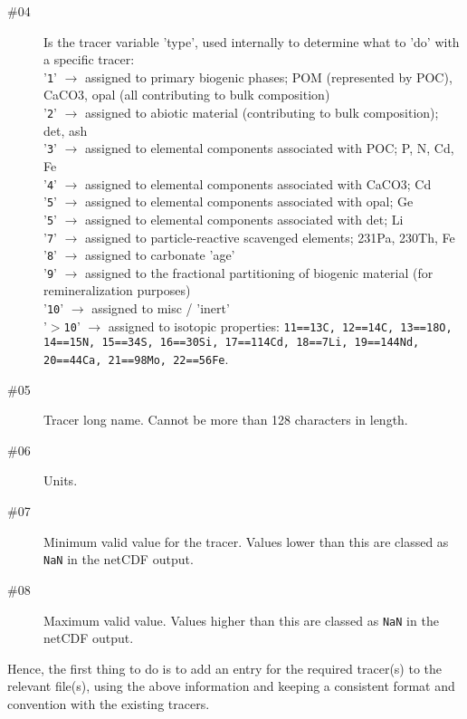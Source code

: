 \documentclass[11pt,fleqn]{book} %
\begin{document}
\begin{enumerate}
\begin{description}
\item[\#04] Is the tracer variable 'type', used internally to determine what to 'do' with a specific tracer:
    \\'\texttt{1}' \(\rightarrow\) assigned to primary biogenic phases; POM (represented by POC), CaCO3, opal (all contributing to bulk composition)
    \\'\texttt{2}' \(\rightarrow\) assigned to abiotic material (contributing to bulk composition); det, ash
    \\'\texttt{3}' \(\rightarrow\) assigned to elemental components associated with POC; P, N, Cd, Fe
    \\'\texttt{4}' \(\rightarrow\) assigned to elemental components associated with CaCO3; Cd
    \\'\texttt{5}' \(\rightarrow\) assigned to elemental components associated with opal; Ge
    \\'\texttt{5}' \(\rightarrow\) assigned to elemental components associated with det; Li
    \\'\texttt{7}' \(\rightarrow\) assigned to particle-reactive scavenged elements; 231Pa, 230Th, Fe
    \\'\texttt{8}' \(\rightarrow\) assigned to carbonate 'age'
    \\'\texttt{9}' \(\rightarrow\) assigned to the fractional partitioning of biogenic material (for remineralization purposes)
   \\'\texttt{10}' \(\rightarrow\) assigned to misc / 'inert'
\\'\texttt{\(>\)10}' \(\rightarrow\) assigned to isotopic properties: \texttt{11==13C, 12==14C, 13==18O, 14==15N, 15==34S, 16==30Si, 17==114Cd, 18==7Li, 19==144Nd, 20==44Ca, 21==98Mo, 22==56Fe}.
\item[\#05] Tracer long name. Cannot be more than 128 characters in length.
\item[\#06] Units.
\item[\#07] Minimum valid value for the tracer. Values lower than this are classed as \texttt{NaN} in the netCDF output.
\item[\#08] Maximum valid value. Values higher than this are classed as \texttt{NaN} in the netCDF output.
\end{description}
Hence, the first thing to do is to add an entry for the required tracer(s) to the relevant file(s), using the above information and keeping a consistent format and convention with the existing tracers.


\end{enumerate}
\end{document}
